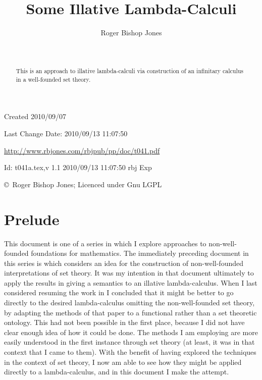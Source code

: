 \documentclass[11pt]{article}
\title{Some Illative Lambda-Calculi}
\author{Roger Bishop Jones}
\date{\ }
\begin{document}
\begin{titlepage}
\maketitle
\begin{abstract}
This is an approach to illative lambda-calculi via construction of an infinitary calculus in a well-founded set theory.
\end{abstract}
\vfill

\begin{centering}
{\footnotesize

Created 2010/09/07

Last Change $ $Date: 2010/09/13 11:07:50 $ $

\href{http://www.rbjones.com/rbjpub/pp/doc/t041.pdf}
{http://www.rbjones.com/rbjpub/pp/doc/t041.pdf}

$ $Id: t041a.tex,v 1.1 2010/09/13 11:07:50 rbj Exp $ $

\copyright\ Roger Bishop Jones; Licenced under Gnu LGPL

}%
\end{centering}

\thispagestyle{empty}
\end{titlepage}

\newpage
\addtocounter{page}{1}
{\parskip=0pt\tableofcontents}

\section{Prelude}

This document is one of a series in which I explore approaches to non-well-founded foundations for mathematics.
The immediately preceding document in this series is \cite{rbjt027} which considers an idea for the construction of non-well-founded interpretations of set theory.
It was my intention in that document ultimately to apply the results in giving a semantics to an illative lambda-calculus.
When I last considered resuming the work in \cite{rbjt027} I concluded that it might be better to go directly to the desired lambda-calculus omitting the non-well-founded set theory, by adapting the methods of that paper to a functional rather than a set theoretic ontology.
This had not been possible in the first place, because I did not have clear enough idea of how it could be done.
The methods I am employing are more easily understood in the first instance through set theory (at least, it was in that context that I came to them).
With the benefit of having explored the techniques in the context of set theory, I now am able to see how they might be applied directly to a lambda-calculus, and in this document I make the attempt.
\end{document}
